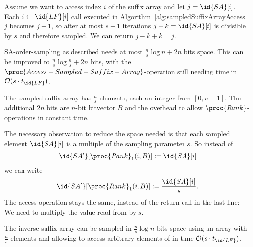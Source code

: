 \begin{Proof}
  Assume we want to access index $i$ of the suffix array  and let $j = \id{SA}[i]$. Each $i \gets \id{LF}[i]$ call executed in Algorithm~\ref{alg:sampledSuffixArrayAccess} $j$ becomes $j-1$, so after at most $s - 1$ iterations $j - k = \id{SA}[i]$ is divisible by $s$ and therefore sampled. We can return $j - k + k = j$.
\end{Proof}

\begin{Theorem}
  SA-order-sampling as described needs at most $\frac{n}{s}\log n + 2n$ bits space. This can be improved to $\frac{n}{s}\log\frac{n}{s} + 2n$ bits, with the $\proc{Access-Sampled-Suffix-Array}$-operation still needing time in $\mathcal{O}(s\cdot t_{\id{LF}})$.
\end{Theorem}

\begin{Proof}
  The sampled suffix array has $\frac{n}{s}$ elements, each an integer from $[0,n-1]$. The additional $2n$ bits are $n$-bit bitvector $B$ and the overhead to allow $\proc{Rank}$-operations in constant time.

  The necessary observation to reduce the space needed is that each sampled element $\id{SA}[i]$ is a multiple of the sampling parameter $s$. So instead of \begin{align}
    \id{SA'}[\proc{Rank}_1(i, B)] := \id{SA}[i]
  \end{align}
  we can write
  \begin{align}
    \id{SA'}[\proc{Rank}_1(i, B)] := \frac{\id{SA}[i]}{s}
    \text{.}
  \end{align}
  The access operation stays the same, instead of the return call in the last line: We need to multiply the value read from  by $s$.
\end{Proof}

\begin{Theorem}
  The inverse suffix array  can be sampled in $\frac{n}{s}\log n$ bits space using an array with $\frac{n}{s}$ elements and allowing to access arbitrary elements of  in time $\mathcal{O}(s\cdot t_{\id{LF}})$.
\end{Theorem}

